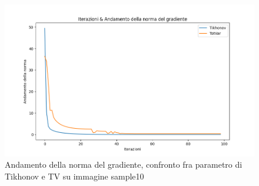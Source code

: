 \documentclass[12pt]{article}
\begin{document}
    \begin{figure}[h!]
    \centering
    \includegraphics[width=12cm]{norma-sample10}
    \caption{Andamento della norma del gradiente, confronto fra parametro di Tikhonov e TV su immagine sample10}
    \label{graph:6}
    \end{figure}
    
    \clearpage
    \listoffigures
    \newpage
    \listoftables

    
\end{document}

